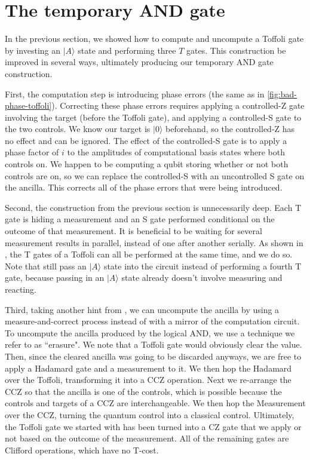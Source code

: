 \documentclass[twocolumn,longbibliography]{quantumarticle-customized}
\begin{document}
\section{The temporary AND gate}
\label{sec:temporary-and}

In the previous section, we showed how to compute and uncompute a Toffoli gate by investing an $|A\rangle$ state and performing three $T$ gates.
This construction be improved in several ways, ultimately producing our temporary AND gate construction.

First, the computation step is introducing phase errors (the same as in \autoref{fig:bad-phase-toffoli}).
Correcting these phase errors requires applying a controlled-Z gate involving the target (before the Toffoli gate), and applying a controlled-S gate to the two controls.
We know our target is $|0\rangle$ beforehand, so the controlled-Z has no effect and can be ignored.
The effect of the controlled-S gate is to apply a phase factor of $i$ to the amplitudes of computational basis states where both controls on.
We happen to be computing a qubit storing whether or not both controls are on, so we can replace the controlled-S with an uncontrolled S gate on the ancilla.
This corrects all of the phase errors that were being introduced.

Second, the construction from the previous section is unnecessarily deep.
Each T gate is hiding a measurement and an S gate performed conditional on the outcome of that measurement.
It is beneficial to be waiting for several measurement results in parallel, instead of one after another serially.
As shown in \cite{Jones2013}, the T gates of a Toffoli can all be performed at the same time, and we do so.
Note that still pass an $|A\rangle$ state into the circuit instead of performing a fourth T gate, because passing in an $|A\rangle$ state already doesn't involve measuring and reacting.

Third, taking another hint from \cite{Jones2013}, we can uncompute the ancilla by using a measure-and-correct process instead of with a mirror of the computation circuit.
To uncompute the ancilla produced by the logical AND, we use a technique we refer to as ``erasure".
We note that a Toffoli gate would obviously clear the value.
Then, since the cleared ancilla was going to be discarded anyways, we are free to apply a Hadamard gate and a measurement to it.
We then hop the Hadamard over the Toffoli, transforming it into a CCZ operation.
Next we re-arrange the CCZ so that the ancilla is one of the controls, which is possible because the controls and targets of a CCZ are interchangeable.
We then hop the Measurement over the CCZ, turning the quantum control into a classical control.
Ultimately, the Toffoli gate we started with has been turned into a CZ gate that we apply or not based on the outcome of the measurement.
All of the remaining gates are Clifford operations, which have no T-cost.
\end{document}
